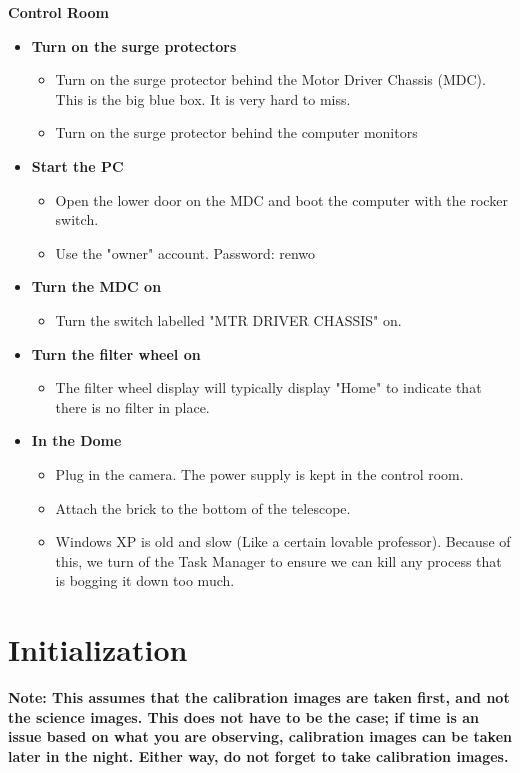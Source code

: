 \documentclass[letterpaper, 12pt]{report}
\begin{document}
{\large\textbf{Control Room}}
\begin{itemize}
	\item \textbf{Turn on the surge protectors}
	\begin{itemize}
		\item Turn on the surge protector behind the Motor Driver Chassis (MDC). This is the big blue box. It is very hard to miss.
		\item Turn on the surge protector behind the computer monitors
	\end{itemize}
	\item \textbf{Start the PC}
	\begin{itemize}
		\item Open the lower door on the MDC and boot the computer with the rocker switch.
		\item Use the "owner" account. Password: renwo
	\end{itemize}
	\item \textbf{Turn the MDC on}
	\begin{itemize}
		\item Turn the switch labelled "MTR DRIVER CHASSIS" on.
	\end{itemize}
	\item \textbf{Turn the filter wheel on}
	\begin{itemize}
		\item The filter wheel display will typically display "Home" to indicate that there is no filter in place.
	\end{itemize}
	\item \textbf{In the Dome}
	\begin{itemize}
		\item Plug in the camera. The power supply is kept in the control room.
		\item Attach the brick to the bottom of the telescope.
	\end{itemize} 
	\begin{itemize}
		\item Windows XP is old and slow (Like a certain lovable professor). Because of this, we turn of the Task Manager to ensure we can kill any process that is bogging it down too much.
	\end{itemize}
\end{itemize}

\newpage



\chapter{Initialization}\label{ch:3}
\textbf{Note: This assumes that the calibration images are taken first, and not the science images. This does not have to be the case; if time is an issue based on what you are observing, calibration images can be taken later in the night. Either way, do not forget to take calibration images.} \\
\end{document}
